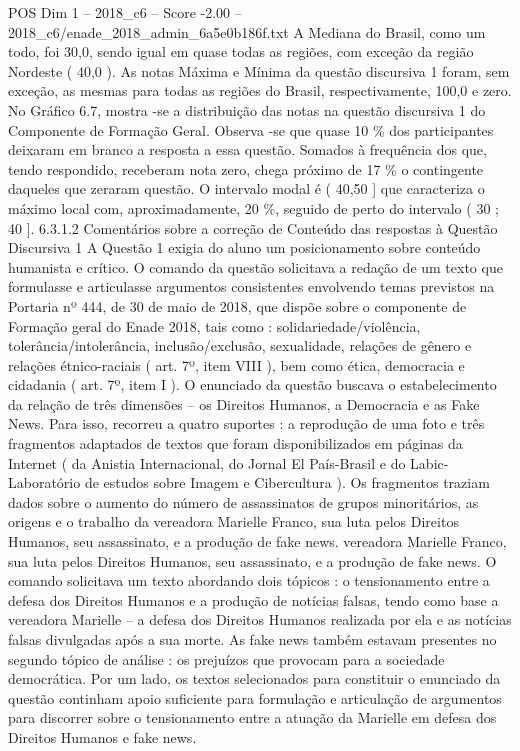 \begin{textsample}{POS Dim 1 – 2018\_c6 – Score -2.00 – 2018\_c6/enade\_2018\_admin\_6a5e0b186f.txt}
A Mediana do Brasil, como um todo, foi 30,0, sendo igual em quase todas as regiões, com exceção da região Nordeste ( 40,0 ).
As notas Máxima e Mínima da questão discursiva 1 foram, sem exceção, as mesmas para todas as regiões do Brasil, respectivamente, 100,0 e zero.
No Gráfico 6.7, mostra -se a distribuição das notas na questão discursiva 1 do Componente de Formação Geral.
Observa -se que quase 10 \% dos participantes deixaram em branco a resposta a essa questão.
Somados à frequência dos que, tendo respondido, receberam nota zero, chega próximo de 17 \% o contingente daqueles que zeraram questão.
O intervalo modal é ( 40,50 ] que caracteriza o máximo local com, aproximadamente, 20 \%, seguido de perto do intervalo ( 30 ; 40 ]. 6.3.1.2 Comentários sobre a correção de Conteúdo das respostas à Questão Discursiva 1 A Questão 1 exigia do aluno um posicionamento sobre conteúdo humanista e crítico.
O comando da questão solicitava a redação de um texto que formulasse e articulasse argumentos consistentes envolvendo temas previstos na Portaria nº 444, de 30 de maio de 2018, que dispõe sobre o componente de Formação geral do Enade 2018, tais como : solidariedade/violência, tolerância/intolerância, inclusão/exclusão, sexualidade, relações de gênero e relações étnico-raciais ( art. 7º, item VIII ), bem como ética, democracia e cidadania ( art. 7º, item I ).
O enunciado da questão buscava o estabelecimento da relação de três dimensões – os Direitos Humanos, a Democracia e as Fake News.
Para isso, recorreu a quatro suportes : a reprodução de uma foto e três fragmentos adaptados de textos que foram disponibilizados em páginas da Internet ( da Anistia Internacional, do Jornal El País-Brasil e do Labic-Laboratório de estudos sobre Imagem e Cibercultura ).
Os fragmentos traziam dados sobre o aumento do número de assassinatos de grupos minoritários, as origens e o trabalho da vereadora Marielle Franco, sua luta pelos Direitos Humanos, seu assassinato, e a produção de fake news. vereadora Marielle Franco, sua luta pelos Direitos Humanos, seu assassinato, e a produção de fake news.
O comando solicitava um texto abordando dois tópicos : o tensionamento entre a defesa dos Direitos Humanos e a produção de notícias falsas, tendo como base a vereadora Marielle – a defesa dos Direitos Humanos realizada por ela e as notícias falsas divulgadas após a sua morte.
As fake news também estavam presentes no segundo tópico de análise : os prejuízos que provocam para a sociedade democrática.
Por um lado, os textos selecionados para constituir o enunciado da questão continham apoio suficiente para formulação e articulação de argumentos para discorrer sobre o tensionamento entre a atuação da Marielle em defesa dos Direitos Humanos e fake news.

\end{textsample}
